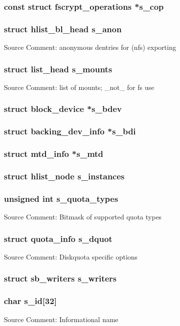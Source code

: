 \documentclass{article}
\newcommand{\sourcecomment}[2][]{Source Comment: #2 \newline #1}
\newcommand{\separator}[0]{\makebox[\textwidth]{\rule{\paperwidth}{0.4pt}}}
\begin{document}
\separator{}

\subsubsection{const struct fscrypt_operations *s_cop}

\separator{}

\subsubsection{struct hlist_bl_head s_anon}
\sourcecomment{anonymous dentries for (nfs) exporting}
\subsubsection{struct list_head s_mounts}
\sourcecomment{list of mounts; _not_ for fs use}
\subsubsection{struct block_device *s_bdev}
\subsubsection{struct backing_dev_info *s_bdi}
\subsubsection{struct mtd_info *s_mtd}
\subsubsection{struct hlist_node s_instances}
\subsubsection{unsigned int s_quota_types}
\sourcecomment{Bitmask of supported quota types}
\subsubsection{struct quota_info s_dquot}
\sourcecomment{Diskquota specific options}

\separator{}

\subsubsection{struct sb_writers s_writers}

\separator{}

\subsubsection{char s_id[32]}
\sourcecomment{Informational name}
\end{document}
